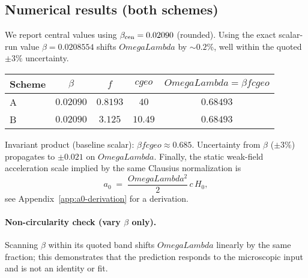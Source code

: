 \documentclass[aps,prd,onecolumn,superscriptaddress,nofootinbib]{revtex4-2}
\def\OmL{OmegaLambda}%
\def\cgeo{cgeo}%
\newcommand{\OmL}{\Omega_\Lambda}
\newcommand{\cgeo}{c_{\rm geo}}
\begin{document}
\subsection{Numerical results (both schemes)}
\label{sec:numerics}
We report central values using \(\beta_{\rm cen}=0.02090\) (rounded). Using the exact scalar-run value \(\beta=0.0208554\) shifts \(\OmL\) by \(\sim 0.2\%\), well within the quoted \(\pm 3\%\) uncertainty.
\begin{center}
\begin{tabular}{l|c|c|c|c}
\hline
Scheme & \(\beta\) & \(f\) & \(\cgeo\) & \(\OmL=\beta f \cgeo\) \\ \hline
A & \(0.02090\) & \(0.8193\) & \(40\) & \(0.68493\) \\
B & \(0.02090\) & \(3.125\) & \(10.49\) & \(0.68493\) \\ \hline
\end{tabular}
\end{center}
\noindent
Invariant product (baseline scalar): \(\beta f \cgeo \approx 0.685\).
Uncertainty from \(\beta\) (\(\pm3\%\)) propagates to \(\pm 0.021\) on \(\OmL\).
\noindent
Finally, the static weak-field acceleration scale implied by the same Clausius normalization is
\begin{equation}
a_0 \;=\; \frac{\OmL^2}{2}\,c\,H_0,
\end{equation}
see Appendix~\ref{app:a0-derivation} for a derivation.

\paragraph*{Non-circularity check (vary \(\beta\) only).}
Scanning \(\beta\) within its quoted band shifts \(\OmL\) linearly by the same fraction; this demonstrates that the prediction responds to the microscopic input and is not an identity or fit.

\end{document}
